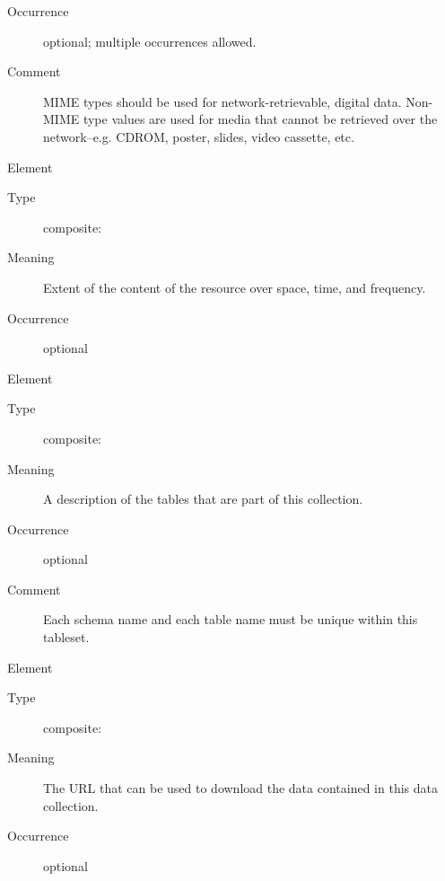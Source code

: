 \documentclass[11pt,a4paper]{ivoa}
\begin{document}
\begin{generated}
\begin{bigdescription}
\begin{description}
\item[Occurrence] optional; multiple occurrences allowed.
\item[Comment] 
                      MIME types should be used for network-retrievable, digital
                      data.  Non-MIME type values are used for media that cannot
                      be retrieved over the network--e.g. CDROM, poster, slides,
                      video cassette, etc.  
                    

\end{description}
\item[Element \xmlel{coverage}]
\begin{description}
\item[Type] composite: 
\item[Meaning] 
                     Extent of the content of the resource over space, time, 
                     and frequency.
                   
\item[Occurrence] optional

\end{description}
\item[Element \xmlel{tableset}]
\begin{description}
\item[Type] composite: 
\item[Meaning] 
                     A description of the tables that are part of this
                     collection. 
                   
\item[Occurrence] optional
\item[Comment] 
                     Each schema name and each table name must be
                     unique within this tableset.
                   

\end{description}
\item[Element \xmlel{accessURL}]
\begin{description}
\item[Type] composite: 
\item[Meaning] 
                     The URL that can be used to download the data contained in 
                     this data collection.
                   
\item[Occurrence] optional

\end{description}


\end{bigdescription}\endgroup

\endgroup
\end{generated}
\end{document}
